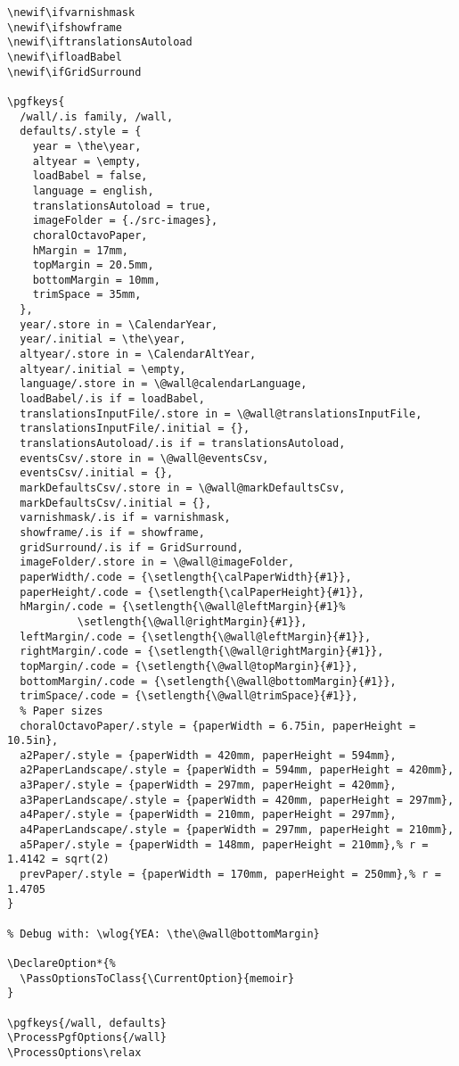 \documentclass[11pt,oneside]{memoir-article}
\begin{document}
\begin{verbatim}
\newif\ifvarnishmask
\newif\ifshowframe
\newif\iftranslationsAutoload
\newif\ifloadBabel
\newif\ifGridSurround

\pgfkeys{
  /wall/.is family, /wall,
  defaults/.style = {
    year = \the\year,
    altyear = \empty,
    loadBabel = false,
    language = english,
    translationsAutoload = true,
    imageFolder = {./src-images},
    choralOctavoPaper,
    hMargin = 17mm,
    topMargin = 20.5mm,
    bottomMargin = 10mm,
    trimSpace = 35mm,
  },
  year/.store in = \CalendarYear,
  year/.initial = \the\year,
  altyear/.store in = \CalendarAltYear,
  altyear/.initial = \empty,
  language/.store in = \@wall@calendarLanguage,
  loadBabel/.is if = loadBabel,
  translationsInputFile/.store in = \@wall@translationsInputFile,
  translationsInputFile/.initial = {},
  translationsAutoload/.is if = translationsAutoload,
  eventsCsv/.store in = \@wall@eventsCsv,
  eventsCsv/.initial = {},
  markDefaultsCsv/.store in = \@wall@markDefaultsCsv,
  markDefaultsCsv/.initial = {},
  varnishmask/.is if = varnishmask,
  showframe/.is if = showframe,
  gridSurround/.is if = GridSurround,
  imageFolder/.store in = \@wall@imageFolder,
  paperWidth/.code = {\setlength{\calPaperWidth}{#1}},
  paperHeight/.code = {\setlength{\calPaperHeight}{#1}},
  hMargin/.code = {\setlength{\@wall@leftMargin}{#1}%
		   \setlength{\@wall@rightMargin}{#1}},
  leftMargin/.code = {\setlength{\@wall@leftMargin}{#1}},
  rightMargin/.code = {\setlength{\@wall@rightMargin}{#1}},
  topMargin/.code = {\setlength{\@wall@topMargin}{#1}},
  bottomMargin/.code = {\setlength{\@wall@bottomMargin}{#1}},
  trimSpace/.code = {\setlength{\@wall@trimSpace}{#1}},
  % Paper sizes
  choralOctavoPaper/.style = {paperWidth = 6.75in, paperHeight = 10.5in},
  a2Paper/.style = {paperWidth = 420mm, paperHeight = 594mm},
  a2PaperLandscape/.style = {paperWidth = 594mm, paperHeight = 420mm},
  a3Paper/.style = {paperWidth = 297mm, paperHeight = 420mm},
  a3PaperLandscape/.style = {paperWidth = 420mm, paperHeight = 297mm},
  a4Paper/.style = {paperWidth = 210mm, paperHeight = 297mm},
  a4PaperLandscape/.style = {paperWidth = 297mm, paperHeight = 210mm},
  a5Paper/.style = {paperWidth = 148mm, paperHeight = 210mm},% r = 1.4142 = sqrt(2)
  prevPaper/.style = {paperWidth = 170mm, paperHeight = 250mm},% r = 1.4705
}

% Debug with: \wlog{YEA: \the\@wall@bottomMargin}

\DeclareOption*{%
  \PassOptionsToClass{\CurrentOption}{memoir}
}

\pgfkeys{/wall, defaults}
\ProcessPgfOptions{/wall}
\ProcessOptions\relax
\end{verbatim}
\end{document}
